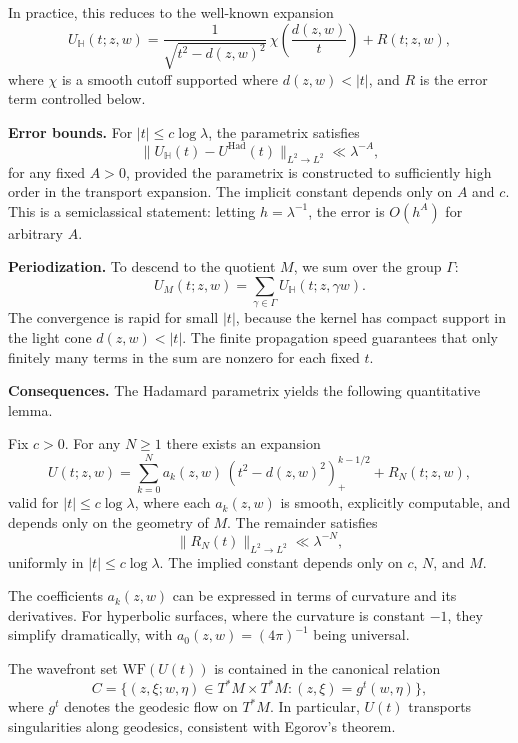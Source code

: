 In practice, this reduces to the well-known expansion
\[
U_{\mathbb{H}}(t; z,w) = \frac{1}{\sqrt{t^2 - d(z,w)^2}} \, \chi\!\left(\frac{d(z,w)}{t}\right) + R(t; z,w),
\]
where $\chi$ is a smooth cutoff supported where $d(z,w) < |t|$, and $R$ is the error term controlled below.

\medskip

\textbf{Error bounds.} For $|t| \le c \log \lambda$, the parametrix satisfies
\[
\| U_{\mathbb{H}}(t) - U^{\mathrm{Had}}(t)\|_{L^2 \to L^2} \ll \lambda^{-A},
\]
for any fixed $A > 0$, provided the parametrix is constructed to sufficiently high order in the transport expansion. The implicit constant depends only on $A$ and $c$. This is a semiclassical statement: letting $h = \lambda^{-1}$, the error is $O(h^A)$ for arbitrary $A$.

\medskip

\textbf{Periodization.} To descend to the quotient $M$, we sum over the group $\Gamma$:
\[
U_M(t; z, w) = \sum_{\gamma \in \Gamma} U_{\mathbb{H}}(t; z, \gamma w).
\]
The convergence is rapid for small $|t|$, because the kernel has compact support in the light cone $d(z,w) < |t|$. The finite propagation speed guarantees that only finitely many terms in the sum are nonzero for each fixed $t$.

\medskip

\textbf{Consequences.} The Hadamard parametrix yields the following quantitative lemma.

\begin{lemma}\label{lem:hadamard}
Fix $c > 0$. For any $N \ge 1$ there exists an expansion
\[
U(t; z,w) = \sum_{k=0}^{N} a_k(z,w)\, (t^2 - d(z,w)^2)_+^{k-1/2} + R_N(t; z,w),
\]
valid for $|t| \le c \log \lambda$, where each $a_k(z,w)$ is smooth, explicitly computable, and depends only on the geometry of $M$. The remainder satisfies
\[
\|R_N(t)\|_{L^2 \to L^2} \ll \lambda^{-N},
\]
uniformly in $|t| \le c \log \lambda$. The implied constant depends only on $c$, $N$, and $M$.
\end{lemma}

\begin{remark}
The coefficients $a_k(z,w)$ can be expressed in terms of curvature and its derivatives. For hyperbolic surfaces, where the curvature is constant $-1$, they simplify dramatically, with $a_0(z,w) = (4\pi)^{-1}$ being universal.
\end{remark}

\begin{corollary}\label{cor:wavefront}
The wavefront set $\mathrm{WF}(U(t))$ is contained in the canonical relation
\[
C = \{(z,\xi; w, \eta) \in T^*M \times T^*M : (z,\xi) = g^t(w,\eta)\},
\]
where $g^t$ denotes the geodesic flow on $T^*M$. In particular, $U(t)$ transports singularities along geodesics, consistent with Egorov’s theorem.
\end{corollary}

